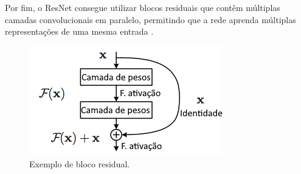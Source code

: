 Por fim, o ResNet  consegue utilizar blocos residuais que contêm múltiplas camadas convolucionais em paralelo, permitindo que a rede aprenda múltiplas representações de uma mesma entrada \cite{Vanshika2021}.


\begin{figure}[htb]
    \centering
    \includegraphics[width=0.5\linewidth]{TCC UFG/images/adap_cama_res.png}
    \caption{Exemplo de bloco residual.}
    \label{fig:camada_residual}
\end{figure}
 
